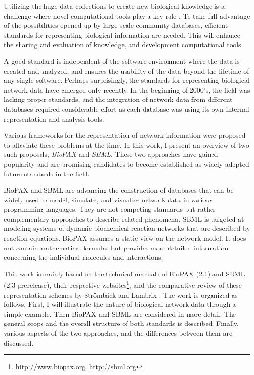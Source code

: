 \documentclass[a4paper,10pt,titlepage]{article}
\begin{document}
Utilizing the huge data collections to create new biological knowledge is a challenge where novel computational tools play a key role \cite{Cohen04}. To take full advantage of the possibilities opened up by large-scale community databases, efficient standards for representing biological information are needed. This will enhance the sharing and evaluation of knowledge, and development computational tools. 

A good standard is independent of the software environment where the data is created and analyzed, and ensures the usability of the data beyond the lifetime of any single software. Perhaps surprisingly, the standards for representing biological network data have emerged only recently. In the beginning of 2000's, the field was lacking proper standards, and the integration of network data from different databases required considerable effort as each database was using its own internal representation and analysis tools. 

Various frameworks for the representation of network information were proposed to alleviate these problems at the time. In this work, I present an overview of two such proposals, {\it BioPAX} and {\it SBML}. These two approaches have gained popularity and are promising candidates to become established as widely adopted future standards in the field.

BioPAX and SBML are advancing the construction of databases that can be widely used to model, simulate, and visualize network data in various programming languages. They are not competing standards but rather complementary approaches to describe related phenomena. SBML is targeted at modeling systems of dynamic biochemical reaction networks that are described by reaction equations. BioPAX assumes a static view on the network model. It does not contain mathematical formulas but provides more detailed information concerning the individual molecules and interactions.

This work is mainly based on the technical manuals of BioPAX (2.1) and SBML (2.3 prerelease), their respective websites\footnote{http://www.biopax.org, http://sbml.org}, and the comparative review of these representation schemes by Str\"omb\"ack and Lambrix \cite{Stromback05}. The work is organized as follows. First, I will illustrate the nature of biological network data through a simple example. Then BioPAX and SBML are considered in more detail. The general scope and the overall structure of both standards is described. Finally, various aspects of the two approaches, and the differences between them are discussed. 
\end{document}
